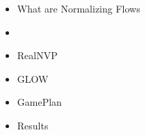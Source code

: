 \begin{frame}
\begin{itemize}
    \item What are Normalizing Flows
    \item \textbf{\color{red}{NICE}}
    \item RealNVP
    \item GLOW
    \item GamePlan
    \item Results
\end{itemize}
\end{frame}
